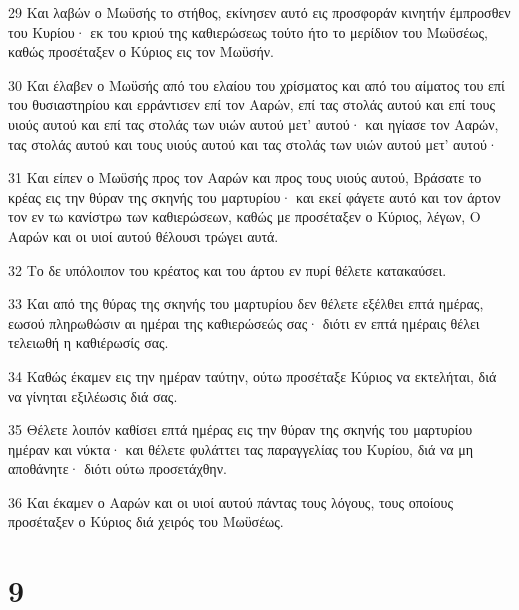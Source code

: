\par 29 Και λαβών ο Μωϋσής το στήθος, εκίνησεν αυτό εις προσφοράν κινητήν έμπροσθεν του Κυρίου· εκ του κριού της καθιερώσεως τούτο ήτο το μερίδιον του Μωϋσέως, καθώς προσέταξεν ο Κύριος εις τον Μωϋσήν.
\par 30 Και έλαβεν ο Μωϋσής από του ελαίου του χρίσματος και από του αίματος του επί του θυσιαστηρίου και ερράντισεν επί τον Ααρών, επί τας στολάς αυτού και επί τους υιούς αυτού και επί τας στολάς των υιών αυτού μετ' αυτού· και ηγίασε τον Ααρών, τας στολάς αυτού και τους υιούς αυτού και τας στολάς των υιών αυτού μετ' αυτού·
\par 31 Και είπεν ο Μωϋσής προς τον Ααρών και προς τους υιούς αυτού, Βράσατε το κρέας εις την θύραν της σκηνής του μαρτυρίου· και εκεί φάγετε αυτό και τον άρτον τον εν τω κανίστρω των καθιερώσεων, καθώς με προσέταξεν ο Κύριος, λέγων, Ο Ααρών και οι υιοί αυτού θέλουσι τρώγει αυτά.
\par 32 Το δε υπόλοιπον του κρέατος και του άρτου εν πυρί θέλετε κατακαύσει.
\par 33 Και από της θύρας της σκηνής του μαρτυρίου δεν θέλετε εξέλθει επτά ημέρας, εωσού πληρωθώσιν αι ημέραι της καθιερώσεώς σας· διότι εν επτά ημέραις θέλει τελειωθή η καθιέρωσίς σας.
\par 34 Καθώς έκαμεν εις την ημέραν ταύτην, ούτω προσέταξε Κύριος να εκτελήται, διά να γίνηται εξιλέωσις διά σας.
\par 35 Θέλετε λοιπόν καθίσει επτά ημέρας εις την θύραν της σκηνής του μαρτυρίου ημέραν και νύκτα· και θέλετε φυλάττει τας παραγγελίας του Κυρίου, διά να μη αποθάνητε· διότι ούτω προσετάχθην.
\par 36 Και έκαμεν ο Ααρών και οι υιοί αυτού πάντας τους λόγους, τους οποίους προσέταξεν ο Κύριος διά χειρός του Μωϋσέως.

\chapter{9}

